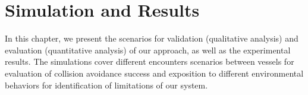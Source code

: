 \chapter{Simulation and Results}
\label{chap:5_Simulation_And_Results}
    
        
        
        
        In this chapter, we present the scenarios for validation (qualitative analysis) and evaluation (quantitative analysis) of our approach, as well as the experimental results. The simulations cover different encounters scenarios between vessels for evaluation of collision avoidance success and exposition to different environmental behaviors for identification of limitations of our system.

